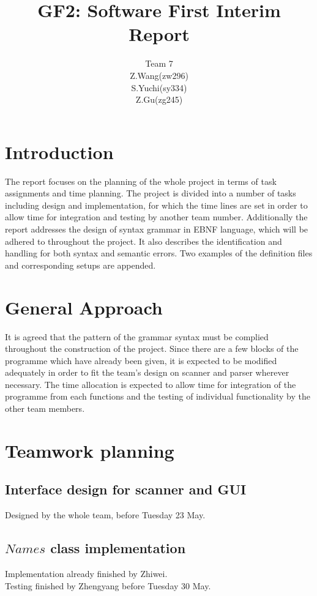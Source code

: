 \documentclass[12pt]{article}
\title{GF2: Software First Interim Report}
\author{Team 7\\Z.Wang(zw296)\\S.Yuchi(sy334)\\Z.Gu(zg245)}
\begin{document}
\maketitle

\vspace{80mm}
\section{Introduction}
The report focuses on the planning of the whole project in terms of task assignments and time planning. The project is divided into a number of 
tasks including design and implementation, for which the time lines are set in order to allow time for integration and testing by another team number. Additionally the report 
addresses the design of syntax grammar in EBNF language, which will be adhered to throughout the project. It also describes the identification 
and handling for both syntax and semantic errors. Two examples of the definition files and corresponding setups are appended.

\newpage
\section{General Approach}
It is agreed that the pattern of the grammar syntax must be complied throughout the construction of the project. Since there are a few blocks of the programme which have already been given, it is expected to be modified adequately in order to fit the team's design on scanner and parser wherever necessary. The time allocation is expected to allow time for integration of the programme from each functions and the testing of individual functionality by the other team members.

\section{Teamwork planning}
\subsection{Interface design for scanner and GUI}
Designed by the whole team, before Tuesday 23 May.

\subsection{$Names$ class implementation}
Implementation already finished by Zhiwei.\\
Testing finished by Zhengyang before Tuesday 30 May.
\end{document}
